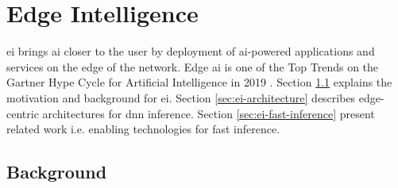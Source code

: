 \hypertarget{Edge Intelligence}{%
	\chapter{Edge Intelligence}\label{ch:edgeintelligence}}

\acrfull{ei} brings \gls{ai} closer to the user by deployment of \gls{ai}-powered applications and services on the edge of the network. Edge \gls{ai} is one of the Top Trends on the Gartner Hype Cycle for Artificial Intelligence in 2019 \cite{goasduff_top_2019}. Section \ref{sec:ei-background} explains the motivation and background for \gls{ei}. Section \ref{sec:ei-architecture} describes edge-centric architectures for \gls{dnn} inference. Section \ref{sec:ei-fast-inference} present related work i.e. enabling technologies for fast inference.

\section{Background}\label{sec:ei-background}

